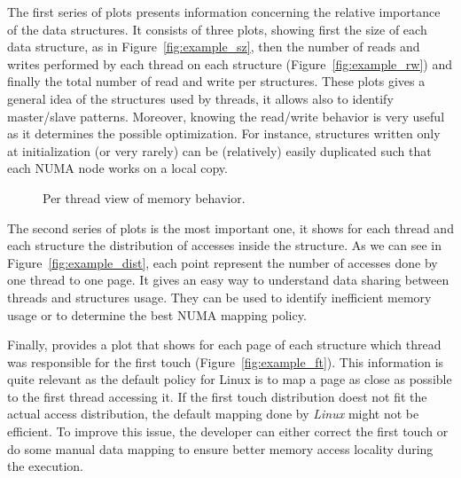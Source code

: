 The first series of plots presents information concerning the relative
importance of the data structures. It consists of three plots, showing first the
size of each data structure, as in Figure~\ref{fig:example_sz}, then the
number of reads and writes performed by each thread on each structure (Figure~\ref{fig:example_rw}) and
finally the total number of read and write per structures. These plots gives a
general idea of the structures used by threads, it allows also to identify
master/slave patterns.  Moreover, knowing the read/write behavior is very
useful as it determines the possible optimization. For instance, structures
written only at initialization (or very rarely) can be (relatively) easily
duplicated such that each NUMA node works on a local copy.

\begin{figure}[htb]
    \centering
    \caption{Per thread view of memory behavior.}
    \label{fig:example_plot2}
\end{figure}

The second series of plots is the most important one, it shows for each thread
and each structure the distribution of accesses inside the structure. As we
can see in Figure~\ref{fig:example_dist}, each point represent the number of
accesses done by one thread to one page. It gives an easy way to understand data
sharing between threads and structures usage. They can be used to identify
inefficient memory usage or to determine the best NUMA mapping policy.



Finally, \TABARNAC provides a plot that shows for each page of each structure
which thread was responsible for the first touch
(Figure~\ref{fig:example_ft}). This information is quite relevant as the
default policy for Linux is to map a page as close as possible to the first
thread accessing it. If the first touch distribution doest not fit the actual
access distribution, the default mapping done by \emph{Linux} might not be
efficient. To improve this issue, the developer can either correct the first
touch or do some manual data mapping to ensure better memory access locality
during the execution.
